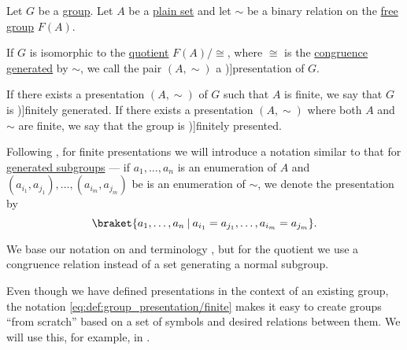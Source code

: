 \begin{definition}\label{def:group_presentation}\mimprovised
  Let \( G \) be a \hyperref[def:group]{group}. Let \( A \) be a \hyperref[def:set]{plain set} and let \( {\sim} \) be a binary relation on the \hyperref[def:free_group]{free group} \( F(A) \).

  If \( G \) is isomorphic to the \hyperref[def:group/quotient]{quotient} \( F(A) / {\cong} \), where \( {\cong} \) is the \hyperref[def:first_order_congruence]{congruence} \hyperref[def:first_order_generated_congruence]{generated} by \( {\sim} \), we call the pair \( (A, {\sim}) \) a \term[en=(group) presentation (\cite[90]{Bourbaki1998Algebra1to3})]{presentation} of \( G \).

  If there exists a presentation \( (A, {\sim}) \) of \( G \) such that \( A \) is finite, we say that \( G \) is \term[en=finitely generated (\cite[90]{Bourbaki1998Algebra1to3})]{finitely generated}. If there exists a presentation \( (A, \sim) \) where both \( A \) and \( {\sim} \) are finite, we say that the group is \term[en=finitely presented (\cite[90]{Bourbaki1998Algebra1to3})]{finitely presented}.

  Following , for finite presentations we will introduce a notation similar to that for \hyperref[def:group/generated]{generated subgroups} --- if \( a_1, \ldots, a_n \) is an enumeration of \( A \) and \( (a_{i_1}, a_{j_1}), \ldots, (a_{i_m}, a_{j_m}) \) be is an enumeration of \( {\sim} \), we denote the presentation by
  \begin{equation}\label{eq:def:group_presentation/finite}
    \braket{ a_1, \ldots, a_n \given a_{i_1} = a_{j_1}, \ldots, a_{i_m} = a_{j_m} }.
  \end{equation}
\end{definition}
\begin{comments}
  \item We base our notation on and terminology \cite[90]{Bourbaki1998Algebra1to3}, but for the quotient we use a congruence relation instead of a set generating a normal subgroup.

  \item Even though we have defined presentations in the context of an existing group, the notation \eqref{eq:def:group_presentation/finite} makes it easy to create groups \enquote{from scratch} based on a set of symbols and desired relations between them. We will use this, for example, in .
\end{comments}

